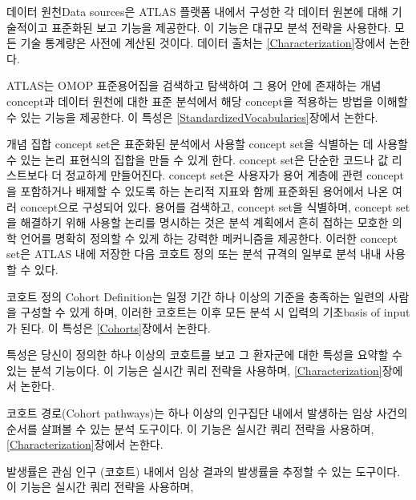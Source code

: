\documentclass[10.5pt]{book}
\providecommand{\tightlist}{%
  \setlength{\itemsep}{0pt}\setlength{\parskip}{0pt}}
\theoremstyle{definition}
\theoremstyle{definition}
\theoremstyle{definition}
\theoremstyle{remark}
\begin{document}
\begin{description}
\tightlist
\item[Data Sources \index{ATLAS!Data Sources}
\index{Achilles|see {ATLAS!data sources}}]
데이터 원천Data sources은 ATLAS 플랫폼 내에서 구성한 각 데이터 원본에
대해 기술적이고 표준화된 보고 기능을 제공한다. 이 기능은 대규모 분석
전략을 사용한다. 모든 기술 통계량은 사전에 계산된 것이다. 데이터 출처는
\ref{Characterization}장에서 논한다.
\item[Vocabulary Search \index{ATLAS!vocabulary search}]
ATLAS는 OMOP 표준용어집을 검색하고 탐색하여 그 용어 안에 존재하는 개념
concept과 데이터 원천에 대한 표준 분석에서 해당 concept을 적용하는
방법을 이해할 수 있는 기능을 제공한다. 이 특성은
\ref{StandardizedVocabularies}장에서 논한다.
\item[Concept Sets \index{ATLAS!concept sets}]
개념 집합 concept set은 표준화된 분석에서 사용할 concept set을 식별하는
데 사용할 수 있는 논리 표현식의 집합을 만들 수 있게 한다. concept set은
단순한 코드나 값 리스트보다 더 정교하게 만들어진다. concept set은
사용자가 용어 계층에 관련 concept을 포함하거나 배제할 수 있도록 하는
논리적 지표와 함께 표준화된 용어에서 나온 여러 concept으로 구성되어
있다. 용어를 검색하고, concept set을 식별하며, concept set을 해결하기
위해 사용할 논리를 명시하는 것은 분석 계획에서 흔히 접하는 모호한 의학
언어를 명확히 정의할 수 있게 하는 강력한 메커니즘을 제공한다. 이러한
concept set은 ATLAS 내에 저장한 다음 코호트 정의 또는 분석 규격의 일부로
분석 내내 사용할 수 있다.
\item[Cohort Definitions \index{ATLAS!cohort definitions}]
코호트 정의 Cohort Definition는 일정 기간 하나 이상의 기준을 충족하는
일련의 사람을 구성할 수 있게 하며, 이러한 코호트는 이후 모든 분석 시
입력의 기초basis of input가 된다. 이 특성은 \ref{Cohorts}장에서 논한다.
\item[Characterizations \index{ATLAS!cohort characterization}]
특성은 당신이 정의한 하나 이상의 코호트를 보고 그 환자군에 대한 특성을
요약할 수 있는 분석 기능이다. 이 기능은 실시간 쿼리 전략을 사용하며,
\ref{Characterization}장에서 논한다.
\item[Cohort Pathways \index{ATLAS!cohort pathways}]
코호트 경로(Cohort pathways)는 하나 이상의 인구집단 내에서 발생하는 임상
사건의 순서를 살펴볼 수 있는 분석 도구이다. 이 기능은 실시간 쿼리 전략을
사용하며, \ref{Characterization}장에서 논한다.
\item[Incidence Rates \index{ATLAS!incidence rates}]
발생률은 관심 인구 (코호트) 내에서 임상 결과의 발생률을 추정할 수 있는
도구이다. 이 기능은 실시간 쿼리 전략을 사용하며,

\end{description}
\end{document}
